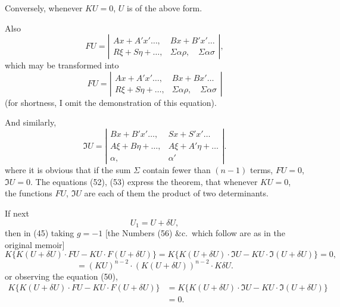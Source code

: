 \documentclass[11pt,a4paper]{book}
\begin{document}
Conversely, whenever $KU=0$, $U$ is of the above form.

Also
\[
FU = \left|\begin{array}{cc}
Ax + A'x' \ldots, & Bx + B'x' \ldots \\
R\xi + S\eta + \ldots, & \Sigma\alpha\rho, \quad \Sigma\alpha\sigma
\end{array}\right|
\tag{50},
\]
which may be transformed into
\[
FU = \left|\begin{array}{cc}
Ax + A'x' \ldots, & Bx + Bx' \ldots \\
R\xi + S\eta + \ldots, & \Sigma\alpha\rho, \quad \Sigma\alpha\sigma
\end{array}\right|
\tag{51}
\]
(for shortness, I omit the demonstration of this equation).

And similarly,
\[
\mathfrak{I}U = \left|\begin{array}{cc}
Bx + B'x' \ldots, & Sx + S'x' \ldots \\
A\xi + B\eta + \ldots, & A\xi + A'\eta + \ldots \\
\alpha, & \alpha'
\end{array}\right|
\tag{52}.
\]
where it is obvious that if the sum $\Sigma$ contain fewer than $(n-1)$ terms, $FU=0$, $\mathfrak{I}U=0$.
The equations (52), (53) express the theorem, that whenever $KU=0$, the functions
$FU$, $\mathfrak{I}U$ are each of them the product of two determinants.

If next
\[
U_1 = U + \delta U,
\]
then in (45) taking $g = -1$ [the Numbers (56) \&c.\ which follow are as in the
original memoir]
\[
K\{K(U+\delta U) \cdot FU - KU \cdot F(U+\delta U)\} = K\{K(U+
\delta U) \cdot \mathfrak{I}U - KU \cdot \mathfrak{I}(U+\delta U)\} = 0 \tag{56},
\]
\[
= (KU)^{n-2} \cdot (K(U+\delta U))^{n-2} \cdot K\delta U.
\]
or observing the equation (50),
\begin{align*}
K\{K(U+\delta U) \cdot FU - KU \cdot F(U+\delta U)\}
&= K\{K(U+\delta U) \cdot \mathfrak{I}U - KU \cdot \mathfrak{I}(U+\delta U)\} \\
&= 0 \tag{57}.
\end{align*}
\end{document}
